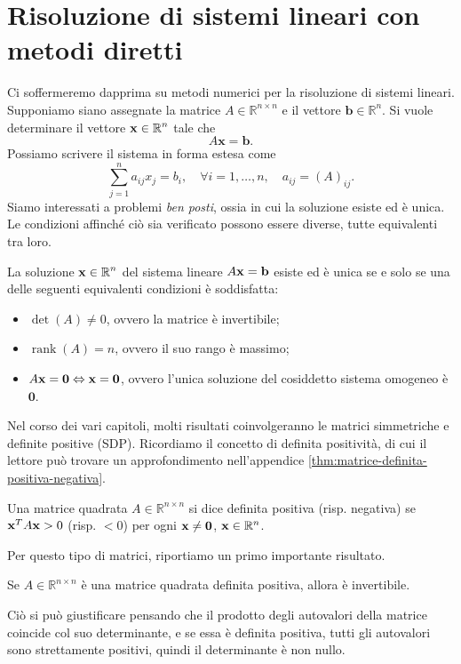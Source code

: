 \quad \chapter{Risoluzione di sistemi lineari con metodi diretti}

Ci soffermeremo dapprima su metodi numerici per la risoluzione di sistemi lineari. Supponiamo siano assegnate la matrice $\displaystyle A\in \mathbb{R}^{n\times n}$ e il vettore $ \mathbf{b} \in \mathbb{R}^{n}$. Si vuole determinare il vettore $\displaystyle \mathbf{x} \in \mathbb{R}^{n}$ tale che
\begin{equation*}
A\mathbf{x=b}.
\end{equation*}
Possiamo scrivere il sistema in forma estesa come
\begin{equation*}
\sum ^{n}_{j=1} a_{ij} x_{j} =b_{i} ,\quad \forall i=1,\dotsc ,n,\quad a_{ij} =(A)_{ij} .
\end{equation*}
Siamo interessati a problemi \textit{ben posti}, ossia in cui la soluzione esiste ed è unica. Le condizioni affinché ciò sia verificato possono essere diverse, tutte equivalenti tra loro.
\begin{theorem}
    La soluzione $\displaystyle \mathbf{x} \in \mathbb{R}^{n}$ del sistema lineare $\displaystyle A\mathbf{x}=\mathbf{b}$ esiste ed è unica se e solo se una delle seguenti equivalenti condizioni è soddisfatta:
    \begin{itemize}
        \item $\det(A) \neq 0$, ovvero la matrice è invertibile;
        \item $\operatorname{rank}(A) =n$, ovvero il suo rango è massimo;
        \item $A\mathbf{x} =\mathbf{0} \Leftrightarrow \mathbf{x} =\mathbf{0}$, ovvero l'unica soluzione del cosiddetto sistema omogeneo è $\mathbf{0}$.
    \end{itemize}
    \label{thm:esistenza-unicita-sl}
\end{theorem}

Nel corso dei vari capitoli, molti risultati coinvolgeranno le matrici simmetriche e definite positive (SDP).
Ricordiamo il concetto di definita positività, di cui il lettore può trovare un approfondimento nell'appendice \ref{thm:matrice-definita-positiva-negativa}.
\begin{definition}
  Una matrice quadrata $A\in \mathbb{R} ^{n\times n} $ si dice definita positiva (risp. negativa) se $\mathbf{x}^{T} A\mathbf{x} > 0$ (risp. $< 0$) per ogni $\mathbf{x} \neq \mathbf{0}$, $\mathbf{x} \in \mathbb{R}^{n}$.
\end{definition}
Per questo tipo di matrici, riportiamo un primo importante risultato.
\begin{theorem}
    Se $A\in \mathbb{R} ^{n\times n} $ è una matrice quadrata definita positiva, allora è invertibile.
    \label{thm:A-DP-invertibile}
\end{theorem}
Ciò si può giustificare pensando che il prodotto degli autovalori della matrice coincide col suo determinante, e se essa è definita positiva, tutti gli autovalori sono strettamente positivi, quindi il determinante è non nullo.

